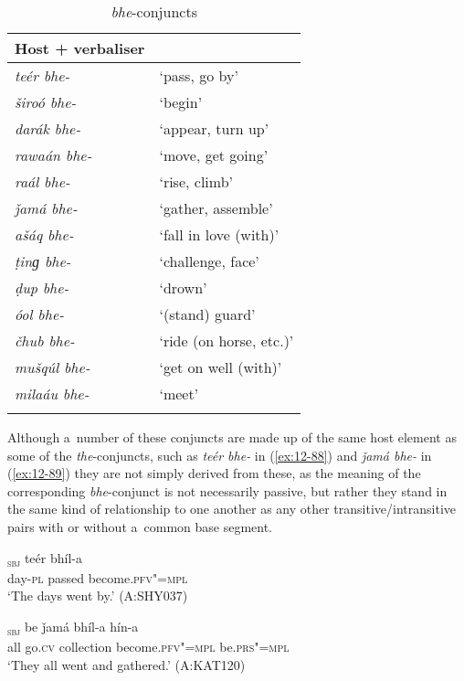 \begin{table}[ht]
\caption{\textit{bhe}-conjuncts}
\begin{tabularx}{.75\textwidth}{ l@{\hspace{45pt}} Q }
\lsptoprule
Host + verbaliser &
\\\hline
\textit{teér bhe-} &
`pass, go by'\\
\textit{široó bhe-} &
`begin'\\
\textit{darák bhe-} &
`appear, turn up'\\
\textit{rawaán bhe-} &
`move, get going'\\
\textit{raál bhe-} &
`rise, climb'\\
\textit{ǰamá bhe-} &
`gather, assemble'\\
\textit{ašáq bhe-} &
`fall in love (with)'\\
\textit{ṭinɡ bhe-} &
`challenge, face'\\
\textit{ḍup bhe-} &
`drown'\\
\textit{óol bhe-} &
`(stand) guard'\\
\textit{čhub bhe-} &
`ride (on horse, etc.)'\\
\textit{mušqúl bhe-} &
`get on well (with)'\\
\textit{milaáu bhe-} &
`meet'\\\lspbottomrule
\end{tabularx}
\label{tab:12-6}
\end{table}


Although a~number of these conjuncts are made up of the same host element as some of the \textit{the}-conjuncts, such as \textit{teér bhe-} in (\ref{ex:12-88}) and \textit{ǰamá bhe-} in (\ref{ex:12-89}) they are not simply derived from these, as the meaning of the corresponding \textit{bhe}-conjunct is not necessarily passive, but rather they stand in the same kind of relationship to one another as any other transitive/intransitive pairs with or without a~common base segment.

\begin{exe}
\ex
\label{ex:12-88}
\gll [dees-á]\textsubscript{\textsc{sbj}} teér bhíl-a \\
day-\textsc{pl} passed become.\textsc{pfv"=mpl} \\
\glt `The days went by.' (A:SHY037)
\end{exe}
\begin{exe}
\ex
\label{ex:12-89}
\gll [buṭheé]\textsubscript{\textsc{sbj}} be ǰamá bhíl-a hín-a  \\
all go.\textsc{cv} collection become.\textsc{pfv"=mpl} be.\textsc{prs"=mpl} \\
\glt `They all went and gathered.' (A:KAT120)
\end{exe}

